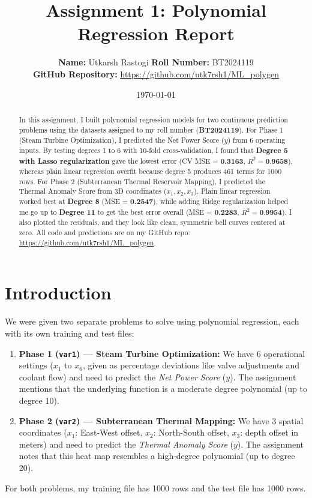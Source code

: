 \documentclass[11pt]{article}
\title{\vspace{-1.5em}\textbf{Assignment 1: Polynomial Regression Report}\vspace{-0.3em}}
\author{
    \textbf{Name:} Utkarsh Rastogi \quad \textbf{Roll Number:} BT2024119 \\
    \textbf{GitHub Repository:} \url{https://github.com/utk7rsh1/ML_polygen}
}
\date{\today\vspace{-1em}}
\begin{document}
\maketitle

\begin{abstract}
In this assignment, I built polynomial regression models for two continuous prediction problems using the datasets assigned to my roll number (\textbf{BT2024119}). For Phase 1 (Steam Turbine Optimization), I predicted the Net Power Score ($y$) from 6 operating inputs. By testing degrees 1 to 6 with 10-fold cross-validation, I found that \textbf{Degree 5 with Lasso regularization} gave the lowest error (CV MSE = \textbf{0.3163}, $R^2 = \textbf{0.9658}$), whereas plain linear regression overfit because degree 5 produces 461 terms for 1000 rows. For Phase 2 (Subterranean Thermal Reservoir Mapping), I predicted the Thermal Anomaly Score from 3D coordinates ($x_1, x_2, x_3$). Plain linear regression worked best at \textbf{Degree 8} (MSE = \textbf{0.2547}), while adding Ridge regularization helped me go up to \textbf{Degree 11} to get the best error overall (MSE = \textbf{0.2283}, $R^2 = \textbf{0.9954}$). I also plotted the residuals, and they look like clean, symmetric bell curves centered at zero. All code and predictions are on my GitHub repo: \url{https://github.com/utk7rsh1/ML_polygen}.
\end{abstract}

\section{Introduction}
We were given two separate problems to solve using polynomial regression, each with its own training and test files:
\begin{enumerate}\itemsep 0pt
    \item \textbf{Phase 1 (\texttt{var1}) --- Steam Turbine Optimization:} We have 6 operational settings ($x_1$ to $x_6$, given as percentage deviations like valve adjustments and coolant flow) and need to predict the \textit{Net Power Score} ($y$). The assignment mentions that the underlying function is a moderate degree polynomial (up to degree 10).
    \item \textbf{Phase 2 (\texttt{var2}) --- Subterranean Thermal Mapping:} We have 3 spatial coordinates ($x_1$: East-West offset, $x_2$: North-South offset, $x_3$: depth offset in meters) and need to predict the \textit{Thermal Anomaly Score} ($y$). The assignment notes that this heat map resembles a high-degree polynomial (up to degree 20).
\end{enumerate}
For both problems, my training file has 1000 rows and the test file has 1000 rows.
\end{document}
